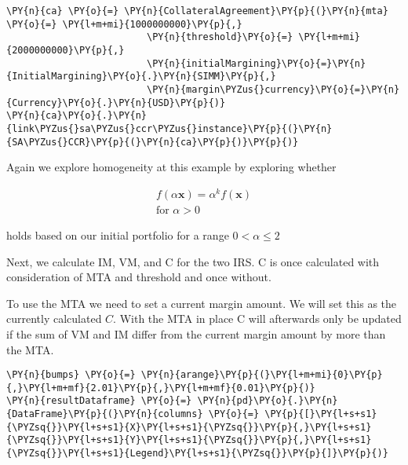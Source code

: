     \begin{tcolorbox}[breakable, size=fbox, boxrule=1pt, pad at break*=1mm,colback=cellbackground, colframe=cellborder]
\begin{Verbatim}[commandchars=\\\{\}]
\PY{n}{ca} \PY{o}{=} \PY{n}{CollateralAgreement}\PY{p}{(}\PY{n}{mta} \PY{o}{=} \PY{l+m+mi}{1000000000}\PY{p}{,}
                         \PY{n}{threshold}\PY{o}{=} \PY{l+m+mi}{2000000000}\PY{p}{,}
                         \PY{n}{initialMargining}\PY{o}{=}\PY{n}{InitialMargining}\PY{o}{.}\PY{n}{SIMM}\PY{p}{,}
                         \PY{n}{margin\PYZus{}currency}\PY{o}{=}\PY{n}{Currency}\PY{o}{.}\PY{n}{USD}\PY{p}{)}
\PY{n}{ca}\PY{o}{.}\PY{n}{link\PYZus{}sa\PYZus{}ccr\PYZus{}instance}\PY{p}{(}\PY{n}{SA\PYZus{}CCR}\PY{p}{(}\PY{n}{ca}\PY{p}{)}\PY{p}{)}
\end{Verbatim}
\end{tcolorbox}

    Again we explore homogeneity at this example by exploring whether

\begin{align*}
f\left(\alpha \mathbf{x}\right) = \alpha^k f\left(\mathbf{x}\right) \\
        \text{for } \alpha >0
\end{align*}

holds based on our initial portfolio for a range \(0<\alpha\leq2\)

    Next, we calculate IM, VM, and C for the two IRS. C is once calculated
with consideration of MTA and threshold and once without.

To use the MTA we need to set a current margin amount. We will set this
as the currently calculated \(C\). With the MTA in place C will
afterwards only be updated if the sum of VM and IM differ from the
current margin amount by more than the MTA.

    \begin{tcolorbox}[breakable, size=fbox, boxrule=1pt, pad at break*=1mm,colback=cellbackground, colframe=cellborder]
\begin{Verbatim}[commandchars=\\\{\}]
\PY{n}{bumps} \PY{o}{=} \PY{n}{arange}\PY{p}{(}\PY{l+m+mi}{0}\PY{p}{,}\PY{l+m+mf}{2.01}\PY{p}{,}\PY{l+m+mf}{0.01}\PY{p}{)}
\PY{n}{resultDataframe} \PY{o}{=} \PY{n}{pd}\PY{o}{.}\PY{n}{DataFrame}\PY{p}{(}\PY{n}{columns} \PY{o}{=} \PY{p}{[}\PY{l+s+s1}{\PYZsq{}}\PY{l+s+s1}{X}\PY{l+s+s1}{\PYZsq{}}\PY{p}{,}\PY{l+s+s1}{\PYZsq{}}\PY{l+s+s1}{Y}\PY{l+s+s1}{\PYZsq{}}\PY{p}{,}\PY{l+s+s1}{\PYZsq{}}\PY{l+s+s1}{Legend}\PY{l+s+s1}{\PYZsq{}}\PY{p}{]}\PY{p}{)}
\end{Verbatim}
\end{tcolorbox}

